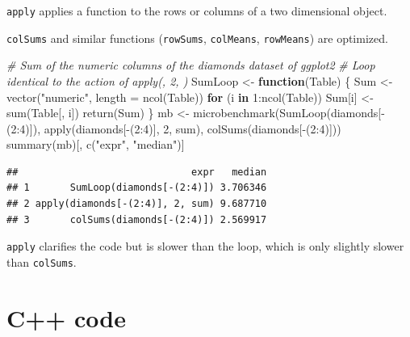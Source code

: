 \documentclass[
  12pt,
  american,
  a4paper,
  extrafontsizes,onecolumn,openright
  ]{memoir}
\newenvironment{Shaded}{\begin{snugshade}}{\end{snugshade}}
\newcommand{\AttributeTok}[1]{\textcolor[rgb]{0.77,0.63,0.00}{#1}}
\newcommand{\CommentTok}[1]{\textcolor[rgb]{0.56,0.35,0.01}{\textit{#1}}}
\newcommand{\ControlFlowTok}[1]{\textcolor[rgb]{0.13,0.29,0.53}{\textbf{#1}}}
\newcommand{\DecValTok}[1]{\textcolor[rgb]{0.00,0.00,0.81}{#1}}
\newcommand{\FunctionTok}[1]{\textcolor[rgb]{0.00,0.00,0.00}{#1}}
\newcommand{\NormalTok}[1]{#1}
\newcommand{\OtherTok}[1]{\textcolor[rgb]{0.56,0.35,0.01}{#1}}
\newcommand{\SpecialCharTok}[1]{\textcolor[rgb]{0.00,0.00,0.00}{#1}}
\newcommand{\StringTok}[1]{\textcolor[rgb]{0.31,0.60,0.02}{#1}}
\begin{document}
\texttt{apply} applies a function to the rows or columns of a two dimensional object.

\texttt{colSums} and similar functions (\texttt{rowSums}, \texttt{colMeans}, \texttt{rowMeans}) are optimized.

\scriptsize

\begin{Shaded}
\begin{Highlighting}[]
\CommentTok{\# Sum of the numeric columns of the diamonds dataset of ggplot2}
\CommentTok{\# Loop identical to the action of apply(, 2, )}
\NormalTok{SumLoop }\OtherTok{\textless{}{-}} \ControlFlowTok{function}\NormalTok{(Table) \{}
\NormalTok{  Sum }\OtherTok{\textless{}{-}} \FunctionTok{vector}\NormalTok{(}\StringTok{"numeric"}\NormalTok{, }\AttributeTok{length =} \FunctionTok{ncol}\NormalTok{(Table))}
  \ControlFlowTok{for}\NormalTok{ (i }\ControlFlowTok{in} \DecValTok{1}\SpecialCharTok{:}\FunctionTok{ncol}\NormalTok{(Table)) Sum[i] }\OtherTok{\textless{}{-}} \FunctionTok{sum}\NormalTok{(Table[, i])}
  \FunctionTok{return}\NormalTok{(Sum)}
\NormalTok{\}}
\NormalTok{mb }\OtherTok{\textless{}{-}} \FunctionTok{microbenchmark}\NormalTok{(}\FunctionTok{SumLoop}\NormalTok{(diamonds[}\SpecialCharTok{{-}}\NormalTok{(}\DecValTok{2}\SpecialCharTok{:}\DecValTok{4}\NormalTok{)]), }
                     \FunctionTok{apply}\NormalTok{(diamonds[}\SpecialCharTok{{-}}\NormalTok{(}\DecValTok{2}\SpecialCharTok{:}\DecValTok{4}\NormalTok{)], }\DecValTok{2}\NormalTok{, sum), }
                     \FunctionTok{colSums}\NormalTok{(diamonds[}\SpecialCharTok{{-}}\NormalTok{(}\DecValTok{2}\SpecialCharTok{:}\DecValTok{4}\NormalTok{)]))}
\FunctionTok{summary}\NormalTok{(mb)[, }\FunctionTok{c}\NormalTok{(}\StringTok{"expr"}\NormalTok{, }\StringTok{"median"}\NormalTok{)]}
\end{Highlighting}
\end{Shaded}

\begin{verbatim}
##                              expr   median
## 1       SumLoop(diamonds[-(2:4)]) 3.706346
## 2 apply(diamonds[-(2:4)], 2, sum) 9.687710
## 3       colSums(diamonds[-(2:4)]) 2.569917
\end{verbatim}

\normalsize

\texttt{apply} clarifies the code but is slower than the loop, which is only slightly slower than \texttt{colSums}.

\hypertarget{sec:cpp}{%
\section{C++ code}\label{sec:cpp}}
\end{document}
